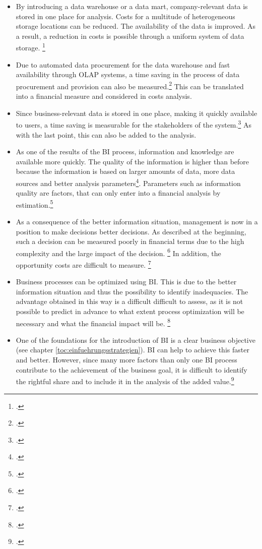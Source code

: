 \begin{itemize}
    \item By introducing a data warehouse or a data mart, company-relevant data is stored in one place for analysis.
    Costs for a multitude of heterogeneous storage locations can be reduced. The availability
    of the data is improved. As a result, a reduction in costs is possible through a uniform system of data storage.
    \footcite[Cf.][p. 105]{azma2012business}
    \item Due to automated data procurement for the data warehouse and fast availability through \ac{OLAP} systems,
    a time saving in the process of data procurement and provision can also be measured.\footcite[Cf.][p. 51]{horakova2013business}
    This can be translated into a financial measure and considered in costs analysis.
    \item Since business-relevant data is stored in one place, making it quickly available to users,
    a time saving is measurable for the stakeholders of the system.\footcite[Cf.][p. 97]{williams2003business} As with the
    last point, this can also be added to the analysis.
    \item As one of the results of the BI process, information and knowledge are available more quickly. The quality of the
    information is higher than before because the information is based on larger amounts of data, more data sources and better analysis
    parameters\footcite[Cf.][p. 51]{horakova2013business}. Parameters such as information quality are factors,
    that can only enter into a financial analysis by estimation.\footcite[Cf.][p. 51]{horakova2013business}
    \item As a consequence of the better information situation, management is now in a position to make decisions better
    decisions. As described at the beginning, such a decision can be measured poorly in financial terms due to the high complexity and the large impact of the decision.
    \footcite[Cf.][p. 51]{horakova2013business} In addition, the opportunity costs are difficult to measure.
    \footcite[Cf.][p. 99]{hovcevar2010assessing}
    \item Business processes can be optimized using \ac{BI}. This is due to the better information situation and
    thus the possibility to identify inadequacies. The advantage obtained in this way is a difficult
    difficult to assess, as it is not possible to predict in advance to what extent process optimization will be necessary and what the financial impact will be.
    \footcite[Cf.][p. 2]{williams2003business}
    \item One of the foundations for the introduction of \ac{BI} is a clear business objective (see chapter \ref{toc:einfuehrungsstrategien}).
    \ac{BI} can help to achieve this faster and better. However, since many more factors than only one BI process
    contribute to the achievement of the business goal, it is difficult to identify the rightful share and to include it in the
    analysis of the added value.\footcite[Cf.][p. 51]{horakova2013business}
\end{itemize}


